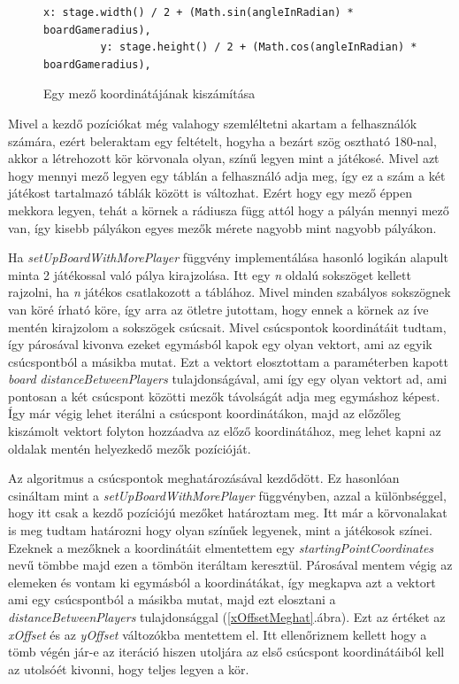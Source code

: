 \documentclass[a4paper,twoside]{article}
\begin{document}
\begin{figure}
	\caption{Egy mező koordinátájának kiszámítása}
	\begin{minipage}{\textwidth}
		\begin{lstlisting}[style=javascriptStyle]
		 x: stage.width() / 2 + (Math.sin(angleInRadian) * boardGameradius),
	   	 y: stage.height() / 2 + (Math.cos(angleInRadian) * boardGameradius),
		\end{lstlisting}
	\end{minipage}
	
	\label{kettesPlayerKoord}
\end{figure}

Mivel a kezdő pozíciókat még valahogy szemléltetni akartam a felhasználók számára, ezért beleraktam egy feltételt, hogyha a bezárt szög osztható 180-nal, akkor a létrehozott kör körvonala olyan, színű legyen mint a játékosé. Mivel azt hogy mennyi mező legyen egy táblán a felhasználó adja meg, így ez a szám a két játékost tartalmazó táblák között is változhat. Ezért hogy egy mező éppen mekkora legyen, tehát a körnek a rádiusza függ attól hogy a pályán mennyi mező van, így kisebb pályákon egyes mezők mérete nagyobb mint nagyobb pályákon.

Ha \textit{setUpBoardWithMorePlayer} függvény implementálása hasonló logikán alapult minta 2 játékossal való pálya kirajzolása. Itt egy \textit{n} oldalú sokszöget kellett rajzolni, ha \textit{n} játékos csatlakozott a táblához. Mivel minden szabályos sokszögnek van köré írható köre, így arra az ötletre jutottam, hogy ennek a körnek az íve mentén kirajzolom a sokszögek csúcsait. Mivel csúcspontok koordinátáit tudtam, így párosával kivonva ezeket egymásból kapok egy olyan vektort, ami az egyik csúcspontból a másikba mutat. Ezt a vektort elosztottam a paraméterben kapott \textit{board} \textit{distanceBetweenPlayers} tulajdonságával, ami így egy olyan vektort ad, ami pontosan a két csúcspont közötti mezők távolságát adja meg egymáshoz képest. Így már végig lehet iterálni a csúcspont koordinátákon, majd az előzőleg kiszámolt vektort folyton hozzáadva az előző koordinátához, meg lehet kapni az oldalak mentén helyezkedő mezők pozícióját.
 
Az algoritmus a csúcspontok meghatározásával kezdődött. Ez hasonlóan csináltam mint a \textit{setUpBoardWithMorePlayer} függvényben, azzal a különbséggel, hogy itt csak a kezdő pozíciójú mezőket határoztam meg. Itt már a körvonalakat is meg tudtam határozni hogy olyan színűek legyenek, mint a játékosok színei. Ezeknek a mezőknek a koordinátáit elmentettem egy \textit{startingPointCoordinates} nevű tömbbe majd ezen a tömbön iteráltam keresztül. Párosával mentem végig az elemeken és vontam ki egymásból a koordinátákat, így megkapva azt a vektort ami egy csúcspontból a másikba mutat, majd ezt elosztani a \textit{distanceBetweenPlayers} tulajdonsággal (\ref{xOffsetMeghat}.ábra). Ezt az értéket az \textit{xOffset} és az \textit{yOffset} változókba mentettem el. Itt ellenőriznem kellett hogy a tömb végén jár-e az iteráció hiszen utoljára az első csúcspont koordinátáiból kell az utolsóét kivonni, hogy teljes legyen a kör. 
 
\end{document}
